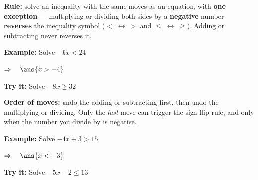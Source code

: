 \documentclass[12pt]{article}
\begin{document}


\begin{formulabox}
\textbf{Rule:} solve an inequality with the same moves as an equation,
with \textbf{one exception} --- multiplying or dividing both sides by a
\textbf{negative} number \textbf{reverses} the inequality symbol
($<\;\leftrightarrow\;>$ and $\le\;\leftrightarrow\;\ge$).
Adding or subtracting never reverses it.
\end{formulabox}

\begin{examplebox}
\textbf{Example:} \quad Solve $-6x < 24$

$\Rightarrow\quad \ans{x > -4}$
\end{examplebox}

\begin{tryitbox}
\textbf{Try it:} \quad Solve $-8x \ge 32$\\[2pt]
\end{tryitbox}


\begin{formulabox}
\textbf{Order of moves:} undo the adding or subtracting first, then undo the
multiplying or dividing. Only the \emph{last} move can trigger the sign-flip
rule, and only when the number you divide by is negative.
\end{formulabox}

\begin{examplebox}
\textbf{Example:} \quad Solve $-4x + 3 > 15$

$\Rightarrow\quad \ans{x < -3}$
\end{examplebox}

\begin{tryitbox}
\textbf{Try it:} \quad Solve $-5x - 2 \le 13$\\[2pt]
\end{tryitbox}
\end{document}
